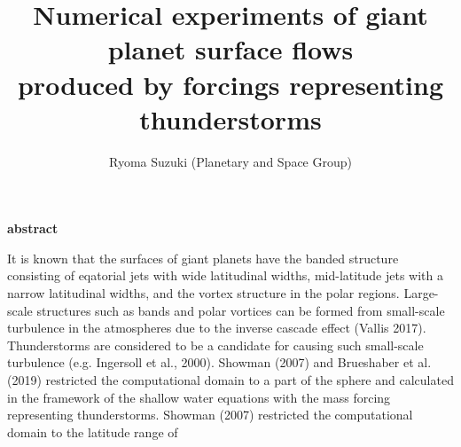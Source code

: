 \documentclass[a4j,8pt]{jarticle}
\begin{document}
\pagestyle{empty} 
\title{\Large Numerical experiments of giant planet surface flows  \\
produced by forcings representing thunderstorms
}

\author{\large Ryoma Suzuki (Planetary and Space Group)}
\date{}
\maketitle
\begin{center}
\bf \large abstract
\end{center}
%
It is known that the surfaces of giant planets have
the banded structure consisting of eqatorial jets with wide latitudinal widths,
mid-latitude jets with a narrow latitudinal widths, and
the vortex structure in the polar regions.
%
Large-scale structures such as bands and polar vortices
can be formed from small-scale turbulence in the atmospheres
due to the inverse cascade effect (Vallis 2017).
Thunderstorms are considered to be
a candidate for causing such small-scale turbulence (e.g. Ingersoll et al., 2000).
%
Showman (2007) and Brueshaber et al. (2019) restricted the
computational domain to a part of the sphere and
calculated in the framework of the shallow water equations
with the mass forcing representing thunderstorms.
%
%
Showman (2007) restricted the computational domain to the latitude range of
\end{document}
